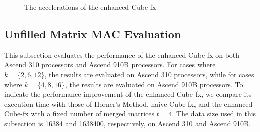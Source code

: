 \begin{figure}[tb]
  \caption{The accelerations of the enhanced Cube-fx}
  \label{fig:results}
  \end{figure}

\subsection{Unfilled Matrix MAC Evaluation}

This subsection evaluates the performance of the enhanced Cube-fx on both Ascend 310 processors and Ascend 910B processors. For cases where $k = \{2, 6, 12\}$, the results are evaluated on Ascend 310 processors, while for cases where $k = \{4, 8, 16\}$, the results are evaluated on Ascend 910B processors. To indicate the performance improvement of the enhanced Cube-fx, we compare its execution time with those of Horner's Method, naive Cube-fx, and the enhanced Cube-fx with a fixed number of merged matrices $t = 4$. The data size used in this subsection is 16384 and 1638400, respectively, on Ascend 310 and Ascend 910B. 

